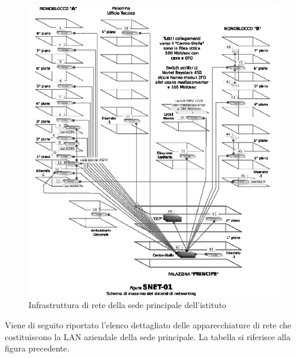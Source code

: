 \documentclass[12pt, a4paper, titlepage]{report}
\begin{document}
		\begin{figure}[h]
		\centering
		\includegraphics[scale=1]{./img/rete.png}
		\caption{Infrastruttura di rete della sede principale dell'istituto}
		\end{figure}
		Viene di seguito riportato l'elenco dettagliato delle apparecchiature di rete che costituiscono la LAN aziendale della sede principale. La tabella si riferisce alla figura precedente.
\end{document}
